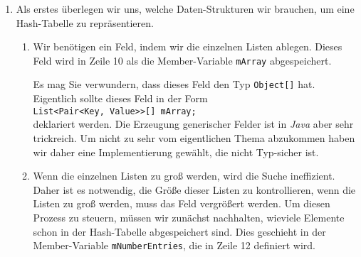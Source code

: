 \begin{enumerate}
\item Als erstes \"uberlegen wir uns, welche Daten-Strukturen wir brauchen,
      um eine Hash-Tabelle zu repr\"asentieren.
      \begin{enumerate}
      \item Wir ben\"otigen ein Feld, indem wir die einzelnen Listen ablegen.
            Dieses Feld wird in Zeile 10 als die Member-Variable \texttt{mArray}
            abgespeichert.

            Es mag Sie verwundern, dass dieses Feld den Typ \texttt{Object[]} hat.
            Eigentlich sollte dieses Feld in der Form \\[0.2cm]
            \hspace*{1.3cm} \texttt{List<Pair<Key, Value>>[] mArray;} \\[0.2cm]
            deklariert werden.  Die Erzeugung generischer Felder ist in \textsl{Java} 
            aber sehr trickreich.  Um nicht zu sehr vom eigentlichen Thema abzukommen
            haben wir daher eine Implementierung gew\"ahlt, die nicht Typ-sicher ist.
      \item Wenn die einzelnen Listen zu gro{\ss} werden, wird die Suche ineffizient.
            Daher ist es notwendig, die Gr\"o{\ss}e dieser Listen zu kontrollieren,
            wenn die Listen zu gro{\ss} werden, muss das Feld vergr\"o{\ss}ert werden.
            Um diesen Prozess zu steuern, m\"ussen wir zun\"achst nachhalten, 
            wieviele Elemente schon in der Hash-Tabelle abgespeichert sind.
            Dies geschieht in der Member-Variable \texttt{mNumberEntries}, die in Zeile 12
            definiert wird.


\end{enumerate}
\end{enumerate}
